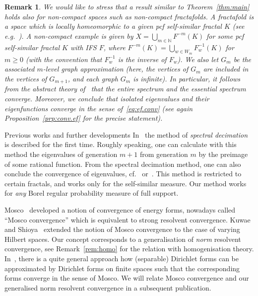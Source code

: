 \documentclass[12pt,reqno,a4paper]{amsart}            %
\makeatletter
\numberwithin{equation}{section}
\newcommand{\myfont}{\sffamily}
\theoremstyle{mythmstyle}       %
\theoremstyle{mydefstyle}        %
\newtheorem{remark}[theorem]{Remark}
\renewcommand\subsection{\@startsection{subsection}{2}%
  \z@{-.5\linespacing\@plus-.7\linespacing}{.5\linespacing}%
  {\large\myfont\bfseries}}
\newcommand{\Thm}[1]{Theorem~\ref{thm:#1}}
\newcommand{\Prp}[1]{Proposition~\ref{prp:#1}}
\newcommand{\Rem}[1]{Remark~\ref{rem:#1}}
\newcommand{\N}{\mathbb{N}} %
\newcommand{\1}{\mathbbm 1}                    %
\newcommand{\pcf}{pcf\xspace}
\makeatother
\begin{document}
\begin{remark}
  \label{rem:fractafold}
  We would like to stress that a result similar to \Thm{main} holds
  also for non-compact spaces such as non-compact \emph{fractafolds}.
  A \emph{fractafold} is a space which is locally homeomorphic to a
  given \pcf self-similar fractal $K$ (see e.g.~\cite{strichartz:03}).
  A non-compact example is given by $X=\bigcup_{m \in \N} F^{-m}(K)$
  for some \pcf self-similar fractal $K$ with IFS $F$, where
  $F^{-m}(K)=\bigcup_{w \in W_m} F_w^{-1}(K)$ for $m \ge 0$ (with the
  convention that $F_w^{-1}$ is the inverse of $F_w$).  We also let
  $G_m$ be the associated $m$-level graph approximation (here, the
  vertices of $G_m$ are included in the vertices of $G_{m+1}$, and
  each graph $G_m$ is infinite).  In particular, it follows from the
  abstract theory of~\cite[Sec.~4.3]{post:12} that the entire spectrum
  and the essential spectrum converge.  Moreover, we conclude that
  isolated eigenvalues and their eigenfunctions converge in the sense
  of~\eqref{eq:ef.conv} (see again \Prp{conv.ef} for the precise
  statement).
\end{remark}


\subsection{Previous works and further developments}
\label{ssec:prev.works}
In~\cite{fukushima-shima:92} the method of \emph{spectral decimation}
is described for the first time.  Roughly speaking, one can calculate
with this method the eigenvalues of generation $m+1$ from generation
$m$ by the preimage of some rational function.  From the spectral
decimation method, one can also conclude the convergence of
eigenvalues, cf.~\cite{fukushima-shima:92}
or~\cite[Sec.~3.1]{shima:96}.  This method is restricted to certain
fractals, and works only for the self-similar measure.  Our method
works for \emph{any} Borel regular probability measure of full
support.

Mosco~\cite{mosco:94} developed a notion of convergence of energy
forms, nowadays called ``Mosco convergence'' which is equivalent to
strong resolvent convergence.  Kuwae and Shioya~\cite[Sec.~2,
esp.~Sec.~2.5]{kuwae-shioya:03} extended the notion of Mosco
convergence to the case of varying Hilbert spaces.  Our concept
corresponds to a generalisation of \emph{norm} resolvent convergence,
see \Rem{homo} for the relation with homogenisation theory.
In~\cite{hinz-teplyaev:16}, there is a quite general approach how
(separable) Dirichlet forms can be approximated by Dirichlet forms on
finite spaces such that the corresponding forms converge in the sense
of Mosco.  We will relate Mosco convergence and our generalised norm
resolvent convergence in a subsequent publication.
\end{document}
